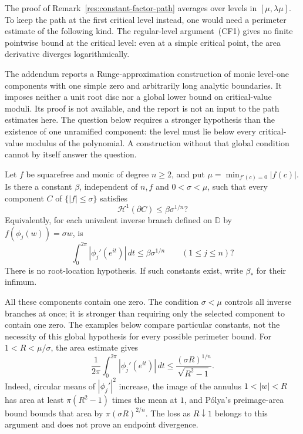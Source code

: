 The proof of Remark~\ref{res:constant-factor-path} averages over
levels in $[\mu,\lambda\mu]$. To keep the path at the first critical
level instead, one would need a perimeter estimate of the following kind.
The regular-level argument~(CF1) gives no finite pointwise bound at the
critical level: even at a simple critical point, the area derivative
diverges logarithmically.

The addendum \cite[Proposition~2]{revision2026} reports a
Runge-approximation construction of monic level-one components with one
simple zero and arbitrarily long analytic boundaries. It imposes neither
a unit root disc nor a global lower bound on critical-value moduli.
Its proof is not available, and
the report is not an input to the path estimates here. The question below
requires a stronger hypothesis than the existence of one unramified
component: the level must lie below every critical-value modulus of the
polynomial. A construction without that global condition cannot by itself
answer the question.

\begin{problem}\label{prob:conjecture-p}
Let $f$ be squarefree and monic of degree $n\ge2$, and put
$\mu=\min_{f'(c)=0}|f(c)|$.  Is there a constant $\beta$, independent of
$n,f$ and $0<\sigma<\mu$, such that every component $C$ of
$\{|f|\le\sigma\}$ satisfies
\[
 \mathcal H^1(\partial C)\le\beta\sigma^{1/n}?
\]
Equivalently, for each univalent inverse branch defined on $\mathbb D$
by $f(\phi_j(w))=\sigma w$, is
\[
 \int_0^{2\pi}|\phi_j'(e^{it})|\,dt\le\beta\sigma^{1/n}
 \qquad(1\le j\le n)?
\]
There is no root-location hypothesis.  If such constants exist, write
$\beta_*$ for their infimum.
\end{problem}
All these components contain one zero. The condition $\sigma<\mu$
controls all inverse branches at once; it is stronger than requiring
only the selected component to contain one zero. The examples below
compare particular constants, not the necessity of this global
hypothesis for every possible perimeter bound.
For $1<R<\mu/\sigma$, the area estimate gives
\[
 \frac{1}{2\pi}\int_0^{2\pi}|\phi_j'(e^{it})|\,dt
 \le \frac{(\sigma R)^{1/n}}{\sqrt{R^2-1}}.
\]
Indeed, circular means of $|\phi_j'|^2$ increase, the image of the annulus
$1<|w|<R$ has area at least $\pi(R^2-1)$ times the mean at $1$, and
P\'olya's preimage-area bound \cite[Theorem~1]{crane} bounds that area by
$\pi(\sigma R)^{2/n}$.  The loss as $R\downarrow1$ belongs to this
argument and does not prove an endpoint divergence.

